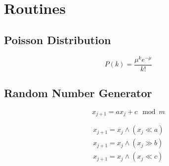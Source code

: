 \newpage
\section{Routines}

    \subsection{Poisson Distribution}
        
        \begin{equation}
            P(k) = \frac{\mu^k e^{-\mu}}{k!}
            \label{eq:poisson}
        \end{equation}

        
        
        
        
    \newpage
    \subsection{Random Number Generator}
    
        \begin{equation}
            x_{j+1} = a x_{j} + c \mod m
            \label{eq:mlcg}
        \end{equation}
        
        \begin{equation}
            \begin{array}{l}
            x_{j+1} = x_{j} \land (x_{j} \ll a) \\
            x_{j+1} = x_{j} \land (x_{j} \gg b) \\
            x_{j+1} = x_{j} \land (x_{j} \ll c)
            \end{array}
            \label{eq:xor_shift}
        \end{equation}

        
        
        
